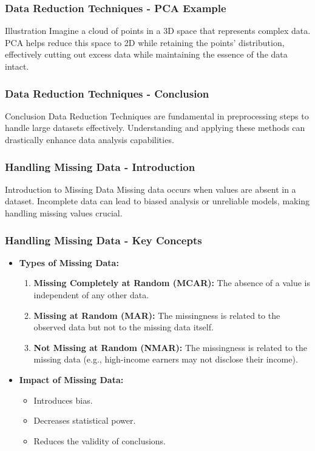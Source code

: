 \documentclass[aspectratio=169]{beamer}
\begin{document}
\begin{frame}[fragile]
    \frametitle{Data Reduction Techniques - PCA Example}
    \begin{block}{Illustration}
        Imagine a cloud of points in a 3D space that represents complex data. PCA helps reduce this space to 2D while retaining the points' distribution, effectively cutting out excess data while maintaining the essence of the data intact.
    \end{block}
\end{frame}

\begin{frame}[fragile]
    \frametitle{Data Reduction Techniques - Conclusion}
    \begin{block}{Conclusion}
        Data Reduction Techniques are fundamental in preprocessing steps to handle large datasets effectively. Understanding and applying these methods can drastically enhance data analysis capabilities.
    \end{block}
\end{frame}

\begin{frame}[fragile]
    \frametitle{Handling Missing Data - Introduction}
    \begin{block}{Introduction to Missing Data}
        Missing data occurs when values are absent in a dataset. Incomplete data can lead to biased analysis or unreliable models, making handling missing values crucial.
    \end{block}
\end{frame}

\begin{frame}[fragile]
    \frametitle{Handling Missing Data - Key Concepts}
    \begin{itemize}
        \item \textbf{Types of Missing Data:}
            \begin{enumerate}
                \item \textbf{Missing Completely at Random (MCAR):} The absence of a value is independent of any other data.
                \item \textbf{Missing at Random (MAR):} The missingness is related to the observed data but not to the missing data itself.
                \item \textbf{Not Missing at Random (NMAR):} The missingness is related to the missing data (e.g., high-income earners may not disclose their income).
            \end{enumerate}
        \item \textbf{Impact of Missing Data:}
            \begin{itemize}
                \item Introduces bias.
                \item Decreases statistical power.
                \item Reduces the validity of conclusions.
            \end{itemize}
    \end{itemize}
\end{frame}
\end{document}
